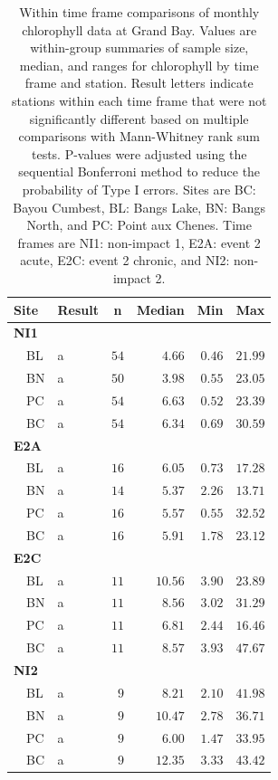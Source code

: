 \documentclass[letterpaper,12pt]{article}\usepackage[]{graphicx}\usepackage[]{color}
\begin{document}
\begin{table}[!tbp]
\caption{Within time frame comparisons of monthly chlorophyll data at Grand Bay.  Values are within-group summaries of sample size, median, and ranges for chlorophyll by time frame and station.  Result letters indicate stations within each time frame that were not significantly different based on multiple comparisons with Mann-Whitney rank sum tests.  P-values were adjusted using the sequential Bonferroni method to reduce the probability of Type I errors. Sites are BC: Bayou Cumbest, BL: Bangs Lake, BN: Bangs North, and PC: Point aux Chenes.  Time frames are NI1: non-impact 1, E2A: event 2 acute, E2C: event 2 chronic, and NI2: non-impact 2.\label{tab:chltab2}} 
\begin{center}
\begin{tabular}{llrrrr}
\hline\hline
\multicolumn{1}{l}{Site}&\multicolumn{1}{c}{Result}&\multicolumn{1}{c}{n}&\multicolumn{1}{c}{Median}&\multicolumn{1}{c}{Min}&\multicolumn{1}{c}{Max}\tabularnewline
\hline
{\bfseries NI1}&&&&&\tabularnewline
~~BL&a&$54$&$ 4.66$&$0.46$&$21.99$\tabularnewline
~~BN&a&$50$&$ 3.98$&$0.55$&$23.05$\tabularnewline
~~PC&a&$54$&$ 6.63$&$0.52$&$23.39$\tabularnewline
~~BC&a&$54$&$ 6.34$&$0.69$&$30.59$\tabularnewline
\hline
{\bfseries E2A}&&&&&\tabularnewline
~~BL&a&$16$&$ 6.05$&$0.73$&$17.28$\tabularnewline
~~BN&a&$14$&$ 5.37$&$2.26$&$13.71$\tabularnewline
~~PC&a&$16$&$ 5.57$&$0.55$&$32.52$\tabularnewline
~~BC&a&$16$&$ 5.91$&$1.78$&$23.12$\tabularnewline
\hline
{\bfseries E2C}&&&&&\tabularnewline
~~BL&a&$11$&$10.56$&$3.90$&$23.89$\tabularnewline
~~BN&a&$11$&$ 8.56$&$3.02$&$31.29$\tabularnewline
~~PC&a&$11$&$ 6.81$&$2.44$&$16.46$\tabularnewline
~~BC&a&$11$&$ 8.57$&$3.93$&$47.67$\tabularnewline
\hline
{\bfseries NI2}&&&&&\tabularnewline
~~BL&a&$ 9$&$ 8.21$&$2.10$&$41.98$\tabularnewline
~~BN&a&$ 9$&$10.47$&$2.78$&$36.71$\tabularnewline
~~PC&a&$ 9$&$ 6.00$&$1.47$&$33.95$\tabularnewline
~~BC&a&$ 9$&$12.35$&$3.33$&$43.42$\tabularnewline
\hline
\end{tabular}\end{center}

\end{table}

\clearpage
\end{document}
